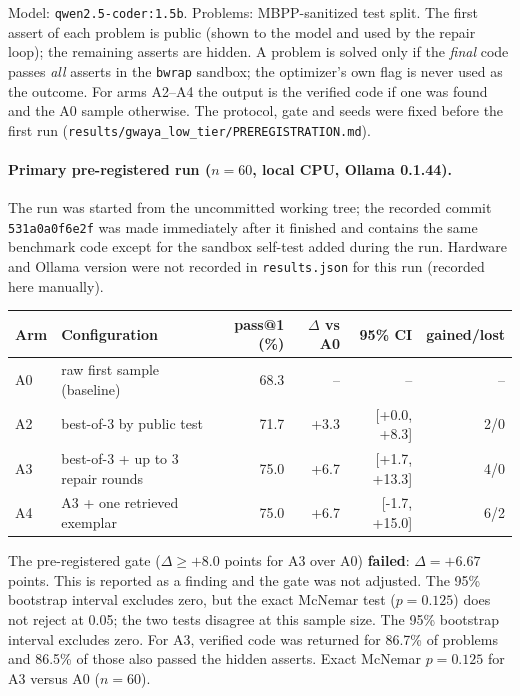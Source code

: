Model: \texttt{qwen2.5-coder:1.5b}. Problems: MBPP-sanitized test split. The first assert of each problem is
public (shown to the model and used by the repair loop); the remaining asserts are hidden. A problem is
solved only if the \emph{final} code passes \emph{all} asserts in the \texttt{bwrap} sandbox; the
optimizer's own flag is never used as the outcome. For arms A2--A4 the output is the verified code if one
was found and the A0 sample otherwise. The protocol, gate and seeds were fixed before the first run
(\texttt{results/gwaya\_low\_tier/PREREGISTRATION.md}).

\paragraph{Primary pre-registered run ($n=60$, local CPU, Ollama 0.1.44).}
The run was started from the uncommitted working tree; the recorded commit
\texttt{531a0a0f6e2f} was made immediately after it finished and contains the same benchmark code
except for the sandbox self-test added during the run. Hardware and Ollama version were not
recorded in \texttt{results.json} for this run (recorded here manually).



\begin{center}\small
\begin{tabular}{llrrrr}\toprule
Arm & Configuration & pass@1 (\%) & $\Delta$ vs A0 & 95\% CI & gained/lost \\\midrule
A0 & raw first sample (baseline) & 68.3 & -- & -- & -- \\
A2 & best-of-3 by public test & 71.7 & +3.3 & [+0.0, +8.3] & 2/0 \\
A3 & best-of-3 + up to 3 repair rounds & 75.0 & +6.7 & [+1.7, +13.3] & 4/0 \\
A4 & A3 + one retrieved exemplar & 75.0 & +6.7 & [-1.7, +15.0] & 6/2 \\
\bottomrule\end{tabular}
\end{center}

The pre-registered gate ($\Delta \ge +8.0$ points for A3 over A0) \textbf{failed}: $\Delta = +6.67$ points. This is reported as a finding and the gate was not adjusted. The 95\% bootstrap interval excludes zero, but the exact McNemar test ($p=0.125$) does not reject at 0.05; the two tests disagree at this sample size. The 95\% bootstrap interval excludes zero. For A3, verified code was returned for 86.7\% of problems and
86.5\% of those also passed the hidden asserts.
Exact McNemar $p = 0.125$ for A3 versus A0 ($n=60$).

